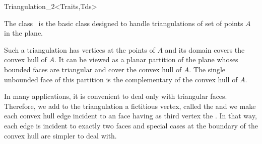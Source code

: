 

\ccModifierCrossRefOff
\begin{ccRefClass}{Triangulation_2<Traits,Tds>}  %


\ccDefinition
  
The class \ccRefName\ is the basic class 
designed to handle triangulations
of set of points ${  A}$ in the plane.

Such a triangulation has vertices at the points of ${  A}$
and its domain covers the convex hull of ${  A}$.
It can be viewed as a planar partition of the plane
whoses bounded faces are triangular and cover
the convex hull of ${  A}$. The single unbounded face of this partition
is the complementary of the convex hull of ${  A}$.
 
In many applications, it is convenient to
deal only with triangular faces. Therefore, we add to the
triangulation
a fictitious vertex, called the 
and we make each  convex hull edge incident 
to an  
face having as third vertex  the .
 In that way, each edge is incident to exactly two faces
and special cases at the
boundary of the convex hull are simpler to deal with.


\end{ccRefClass}
